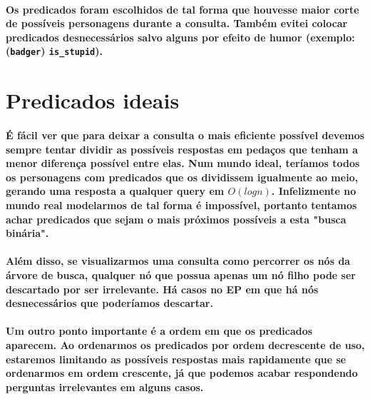 \documentclass[a4paper,10pt]{article}
\theoremstyle{plain}
\begin{document}
\paragraph{
  Os predicados foram escolhidos de tal forma que houvesse maior corte de possíveis personagens
  durante a consulta. Também evitei colocar predicados desnecessários salvo alguns por efeito de
  humor (exemplo: (\texttt{badger}) \texttt{is\_stupid}).
}

\section{Predicados ideais}

\paragraph{
  É fácil ver que para deixar a consulta o mais eficiente possível devemos sempre tentar dividir as
  possíveis respostas em pedaços que tenham a menor diferença possível entre elas. Num mundo ideal,
  teríamos todos os personagens com predicados que os dividissem igualmente ao meio, gerando uma
  resposta a qualquer query em $O(log n)$. Infelizmente no mundo real modelarmos de tal forma é
  impossível, portanto tentamos achar predicados que sejam o mais próximos possíveis a esta "busca
  binária".
}

\paragraph{
  Além disso, se visualizarmos uma consulta como percorrer os nós da árvore de busca, qualquer nó
  que possua apenas um nó filho pode ser descartado por ser irrelevante. Há casos no EP em que há
  nós desnecessários que poderíamos descartar.
}

\paragraph{
  Um outro ponto importante é a ordem em que os predicados aparecem. Ao ordenarmos os predicados
  por ordem decrescente de uso, estaremos limitando as possíveis respostas mais rapidamente que se
  ordenarmos em ordem crescente, já que podemos acabar respondendo perguntas irrelevantes em alguns
  casos.
}
\end{document}
